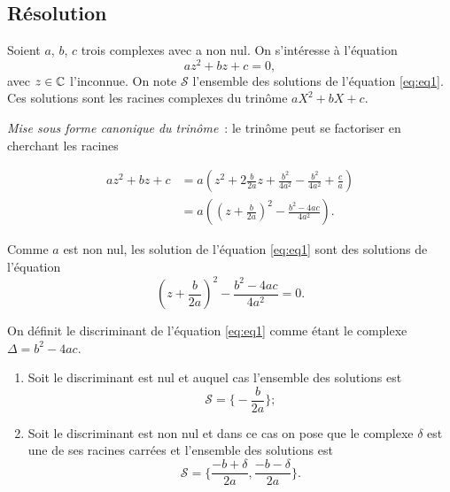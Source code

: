 \subsection{Résolution}
\label{subsec:resolution}

Soient \(a\), \(b\), \(c\) trois complexes avec a non nul. On s'intéresse à 
l'équation
\begin{equation}
  \label{eq:eq1}
  az^2 + bz + c = 0,
\end{equation}
avec \(z \in \mathbb{C}\) l'inconnue. On note \(\mathcal{S}\) l'ensemble des solutions 
de l'équation \eqref{eq:eq1}. Ces solutions sont les racines complexes du 
trinôme \(aX^2 + bX + c\).

\emph{Mise sous forme canonique du trinôme}~: le trinôme peut se factoriser en 
cherchant les racines

\begin{align*}
  az^2 + bz + c & = a \left( z^2+ 2 \frac{b}{2a}z + \frac{b^2}{4a^2} - 
  \frac{b^2}{4a^2}  + \frac{c}{a} \right) \\
  & = a \left( \left( z + \frac{b}{2a} \right)^2 - 
  \frac{b^2-4ac}{4a^2} \right).
\end{align*}

Comme \(a\) est non nul, les solution de l'équation \eqref{eq:eq1} sont des 
solutions de l'équation
\begin{equation}
  \left( z + \frac{b}{2a} \right)^2 - \frac{b^2-4ac}{4a^2} = 0.
\end{equation}

\begin{defdef}
  On définit le discriminant de l'équation \eqref{eq:eq1} comme étant le 
  complexe \(\Delta = b^2-4ac\).
\end{defdef}

\begin{enumerate}
  \item Soit le discriminant est nul et auquel cas l'ensemble des solutions 
    est
    \begin{equation}
      \mathcal{S} = \biggl \lbrace-\frac{b}{2a} \biggl \rbrace;
    \end{equation}
  \item Soit le discriminant est non nul et dans ce cas on pose que le 
    complexe \(\delta\) est une de ses racines carrées et l'ensemble des 
    solutions est
    \begin{equation}
      \mathcal{S} = \biggl \lbrace \frac{-b + \delta}{2a} , 
      \frac{-b-\delta}{2a} \biggl \rbrace.
    \end{equation}
\end{enumerate}

